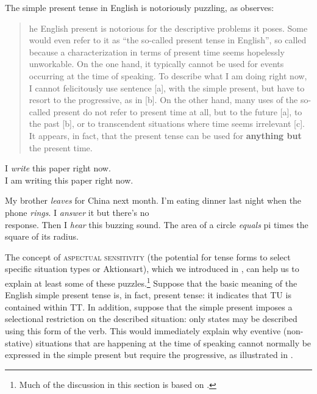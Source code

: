 The simple present tense in English is notoriously puzzling, as \citet{Langacker2001} observes:


\begin{quote}
	\relax [T]he English present is notorious for the descriptive problems it poses. Some would even refer to it as “the so-called present tense in English”, so called because a characterization in terms of present time seems hopelessly unworkable. On the one hand, it typically cannot be used for events occurring at the time of speaking. To describe what I am doing right now, I cannot felicitously use sentence [a], with the simple present, but have to resort to the progressive, as in [b]. On the other hand, many uses of the so-called present do not refer to present time at all, but to the future [a], to the past [b], or to transcendent situations where time seems irrelevant [c]. It appears, in fact, that the present tense can be used for \textbf{anything but} the present time.
\end{quote}

\ea \label{ex:21.7}
\ea  *I \textit{write} this paper right now.\\
\ex I am writing this paper right now.
                       \z
\z

\ea \label{ex:21.8}
\ea  My brother \textit{leaves} for China next month.
\ex  I’m eating dinner last night when the phone \textit{rings}. I \textit{answer} it but there’s no\\
  response. Then I \textit{hear} this buzzing sound.
\ex  The area of a circle \textit{equals} pi times the square of its radius. 
\z \z


The concept of \textsc{aspectual sensitivity} (the potential for tense forms to select specific situation types or Aktionsart), which we introduced in , can help us to explain at least some of these puzzles.\footnote{Much of the discussion in this section is based on \citet{Michaelis2006}.} Suppose that the basic meaning of the English simple present tense is, in fact, present tense: it indicates that TU is contained within TT. In addition, suppose that the simple present imposes a selectional restriction on the described situation: only states may be described using this form of the verb. This would immediately explain why eventive (non-stative) situations that are happening at the time of speaking cannot normally be expressed in the simple present but require the progressive, as illustrated in .



